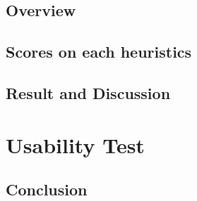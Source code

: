 \documentclass[fontsize=11pt,paper=a4,pagesize=auto]{report}
\begin{document}
\chapter{Overview}
 

\chapter{Scores on each heuristics}



\chapter{Result and Discussion}



\part{Usability Test}


\chapter{Conclusion}

\end{document}
